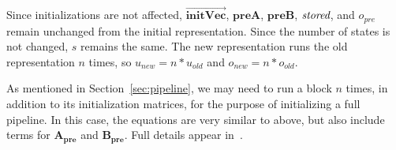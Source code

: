 Since initializations are not affected,
$\overrightarrow{\mathbf{initVec}}$, $\mathbf{preA}$, $\mathbf{preB}$,
$\mbox{\it stored}$, and $o_{pre}$ remain unchanged from the initial
representation. Since the number of states is not changed, $s$ remains
the same. The new representation runs the old representation $n$
times, so $u_{new} = n * u_{old}$ and $o_{new} = n * o_{old}$.

As mentioned in Section~\ref{sec:pipeline}, we may need to run a block
$n$ times, in addition to its initialization matrices, for the purpose
of initializing a full pipeline.  In this case, the equations are very
similar to above, but also include terms for $\mathbf{A_{pre}}$ and
$\mathbf{B_{pre}}$.  Full details appear in~\cite{Agrawal04}.


